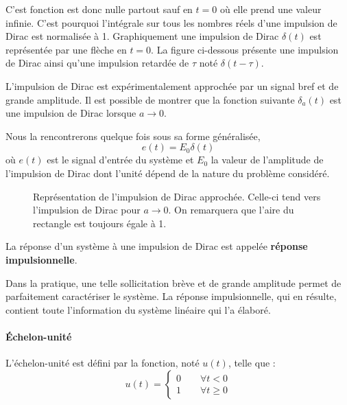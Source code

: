 C'est fonction est donc nulle partout sauf en $t=0$ où elle prend 
une valeur infinie. C'est pourquoi l'intégrale sur tous les nombres réels 
d'une impulsion de Dirac est normalisée à 1.
Graphiquement une impulsion de Dirac $\delta(t)$ est 
représentée par une flèche en $t=0$. La figure ci-dessous présente 
une impulsion de Dirac ainsi qu'une 
impulsion retardée de $\tau$ noté $\delta(t-\tau)$.

\begin{figure}[!h]
\begin{center}

\end{center}
\end{figure}

L'impulsion de Dirac est expérimentalement approchée par un signal 
bref et de grande amplitude. Il est possible de montrer que la fonction
suivante $\delta_a(t)$ est une impulsion de Dirac lorsque $a\to0$.

Nous la rencontrerons quelque fois sous sa forme généralisée, 
$$
e(t)=E_0\delta(t)
$$
où $e(t)$ est le signal d'entrée du système et $E_0$ la valeur de l'amplitude 
de l'impulsion de Dirac dont l'unité dépend de la nature du problème considéré.
\begin{figure}[!h]
\begin{center}

\caption{Représentation de l'impulsion de Dirac approchée. 
Celle-ci tend vers l'impulsion de Dirac pour $a\to0$. On remarquera 
que l'aire du rectangle est toujours égale à 1.\label{fig-dirac2}}
\end{center}
\end{figure}

La réponse d'un système à une impulsion de Dirac est appelée 
\textbf{réponse impulsionnelle}.

Dans la pratique, une telle sollicitation brève et de grande amplitude
permet de parfaitement caractériser le système. La réponse impulsionnelle, 
qui en résulte, contient toute l'information du système 
linéaire qui l'a élaboré.

\paragraph{\'Echelon-unité}
L'échelon-unité est défini par la fonction, noté $u(t)$, telle que :
$$
u(t)=
\begin{cases} 
0 \qquad \forall t<0    \\ 
1 \qquad \forall t\geq 0 
\end{cases}
$$

